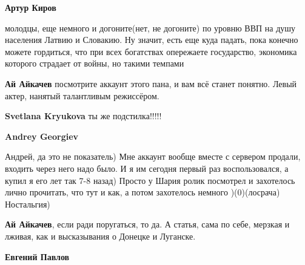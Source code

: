 \begin{itemize}
\begin{itemize}
\textbf{Артур Киров} 

молодцы, еще немного и догоните(нет, не догоните) по уровню ВВП на душу
населения Латвию и Словакию. Ну значит, есть еще куда падать, пока конечно
можете гордиться, что при всех богатствах опережаете государство, экономика
которого страдает от войны, но такими темпами

 
\textbf{Ай Айкачев} посмотрите аккаунт этого пана, и вам всё станет понятно. Левый актер, нанятый талантливым режиссёром.

 
\textbf{Svetlana Kryukova} ты же подстилка!!!!!

 
\textbf{Andrey Georgiev} 

Андрей, да это не показатель) Мне аккаунт вообще вместе с сервером продали,
входить через него надо было. И я им сегодня первый раз воспользовался, а купил
я его лет так 7-8 назад) Просто у Шария ролик посмотрел и захотелось лично
прочитать, что тут и как, а потом захотелось немного )(0)(лосрача) Ностальгия)


 
\textbf{Ай Айкачев}, если ради поругаться, то да. А статья, сама по себе, мерзкая и лживая, как и высказывания о Донецке и Луганске.

 
\textbf{Евгений Павлов} 


\end{itemize}
\end{itemize}
